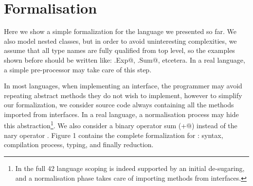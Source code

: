 \section{Formalisation}\label{sec:formal}


Here we show a simple formalization for the language we presented so far.
We also model nested classes, but in order to avoid uninteresting complexities, we assume that
all type names are fully qualified from top level, so the examples shown before should be
written like: \Q@This.Exp@, \Q@This.Sum@, etcetera.
In a real language, a simple pre-processor may take care of this step.

In most languages, when implementing an interface, the programmer may avoid repeating abstract methods
they do not wish to implement, however
to simplify our formalization, we consider source code always containing all the methods imported from interfaces. In a real language, a normalisation process
may hide this abstraction\footnote{
In the full 42 language scoping is indeed supported by an initial de-sugaring, and a normalisation phase takes care of importing methods from interfaces.
}.
We also consider a binary operator sum (\Q@+@) instead of the nary operator \Q@Use@.
Figure 1 contains the complete formalization for \name: syntax,
compilation process, typing, and finally reduction.




